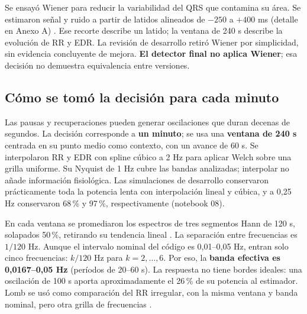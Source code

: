 \documentclass[10pt,a4paper]{article}
\begin{document}
Se ensayó Wiener para reducir la variabilidad del QRS que contamina su área. Se estimaron señal y ruido a partir de latidos alineados de $-250$ a $+400$ ms (detalle en Anexo A) \cite{wiener,sornmo}. Ese recorte describe un latido; la ventana de 240 s describe la evolución de RR y EDR. La revisión de desarrollo retiró Wiener por simplicidad, sin evidencia concluyente de mejora. \textbf{El detector final no aplica Wiener}; esa decisión no demuestra equivalencia entre versiones.

\subsection{Cómo se tomó la decisión para cada minuto}
Las pausas y recuperaciones pueden generar oscilaciones que duran decenas de segundos. La decisión corresponde a \textbf{un minuto}; se usa una \textbf{ventana de 240 s} centrada en su punto medio como contexto, con un avance de 60 s. Se interpolaron RR y EDR con spline cúbico a 2 Hz para aplicar Welch sobre una grilla uniforme. Su Nyquist de 1 Hz cubre las bandas analizadas; interpolar no añade información fisiológica. Las simulaciones de desarrollo conservaron prácticamente toda la potencia lenta con interpolación lineal y cúbica, y a 0,25 Hz conservaron 68\,\% y 97\,\%, respectivamente (notebook 08).

En cada ventana se promediaron los espectros de tres segmentos Hann de 120 s, solapados 50\,\%, retirando su tendencia lineal \cite{welch}. La separación entre frecuencias es $1/120$ Hz. Aunque el intervalo nominal del código es 0,01--0,05 Hz, entran solo cinco frecuencias: $k/120$ Hz para $k=2,\ldots,6$. Por eso, la \textbf{banda efectiva es 0,0167--0,05 Hz} (períodos de 20--60 s). La respuesta no tiene bordes ideales: una oscilación de 100 s aporta aproximadamente el 26\,\% de su potencia al estimador. Lomb se usó como comparación del RR irregular, con la misma ventana y banda nominal, pero otra grilla de frecuencias \cite{lomb,laguna}.
\end{document}
